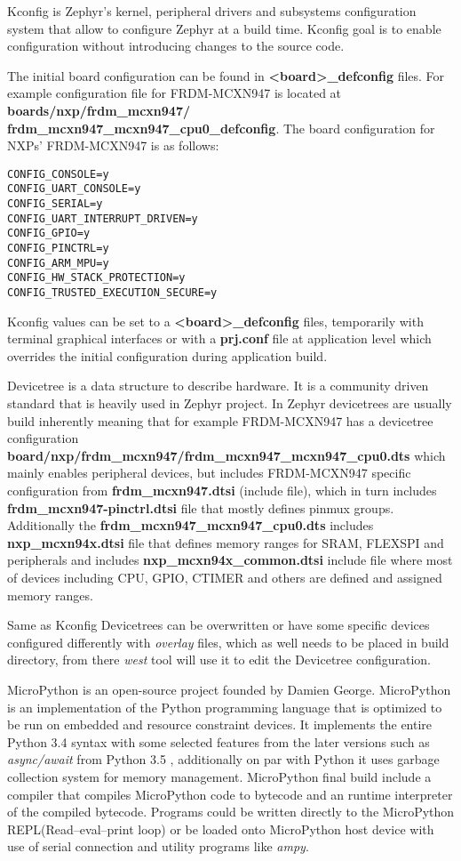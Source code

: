 \documentclass[twoside, 12pt]{article}
\begin{document}
Kconfig is Zephyr's kernel, peripheral drivers and subsystems configuration system that allow 
to configure Zephyr at a build time. Kconfig goal is to enable configuration without 
introducing changes to the source
code.

The initial board configuration can be found in \textbf{<board>\_defconfig} files. For
example configuration file for FRDM-MCXN947 is located at \textbf{boards/nxp/frdm\_mcxn947/
frdm\_mcxn947\_mcxn947\_cpu0\_defconfig}. The board configuration for NXPs' FRDM-MCXN947
is as follows:
\begin{lstlisting}[caption=FRDM-MCXN947 Kconfig configuration]
CONFIG_CONSOLE=y
CONFIG_UART_CONSOLE=y
CONFIG_SERIAL=y
CONFIG_UART_INTERRUPT_DRIVEN=y
CONFIG_GPIO=y
CONFIG_PINCTRL=y
CONFIG_ARM_MPU=y
CONFIG_HW_STACK_PROTECTION=y
CONFIG_TRUSTED_EXECUTION_SECURE=y
\end{lstlisting}

Kconfig values can be set to a \textbf{<board>\_defconfig} files, temporarily with terminal
graphical interfaces or with a \textbf{prj.conf} file at application level which overrides
the initial configuration during application build.\cite{zephyr_kconfig}

Devicetree is a data structure to describe hardware. It is a community driven standard
that is heavily used in Zephyr project. In Zephyr devicetrees are usually build inherently 
meaning that for example FRDM-MCXN947 has a devicetree configuration \textbf{board/nxp/frdm\_mcxn947/frdm\_mcxn947\_mcxn947\_cpu0.dts}
which mainly enables peripheral devices, but includes FRDM-MCXN947 specific configuration 
from \textbf{frdm\_mcxn947.dtsi} (include file), which in turn includes 
\textbf{frdm\_mcxn947-pinctrl.dtsi} file that mostly defines pinmux groups. Additionally the 
\textbf{frdm\_mcxn947\_mcxn947\_cpu0.dts} includes \textbf{nxp\_mcxn94x.dtsi} file that 
defines memory ranges for SRAM, FLEXSPI and peripherals and includes 
\textbf{nxp\_mcxn94x\_common.dtsi} include file where most of devices including CPU, GPIO, 
CTIMER and others are defined and assigned memory ranges.\cite{devicetree_spec}

Same as Kconfig Devicetrees can be overwritten or have some specific devices configured 
differently with \textit{overlay} files, which as well needs to be placed in build directory, 
from there \textit{west} tool will use it to edit the Devicetree configuration.

MicroPython is an open-source project founded by Damien George. MicroPython is an implementation of the Python programming 
language that 
is optimized to be run on embedded and resource constraint devices. It implements 
the entire Python 3.4 syntax with some selected features from the later versions such as
\textit{async/await} from Python 3.5 , additionally on par with Python it uses garbage 
collection system for memory management. MicroPython final build include a compiler that 
compiles MicroPython code to bytecode and an runtime interpreter of the compiled bytecode.
Programs could be written directly to the MicroPython REPL(Read–eval–print loop) or be loaded
onto MicroPython host device with use of serial connection and utility programs like \textit{ampy}.
\end{document}
